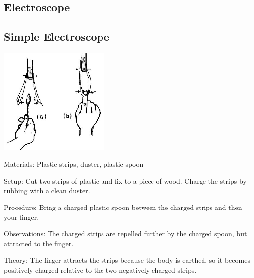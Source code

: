 \begin{multicols}{2}

\section*{Electroscope}


\subsection{Simple Electroscope}

\begin{center}
\includegraphics[width=0.4\textwidth]{./img/source/simple-electroscope.jpg}
\end{center}

\begin{description*}
\item[Materials:]{Plastic strips, duster, plastic spoon}
\item[Setup:]{Cut two strips of plastic and fix to a piece of wood. Charge the strips by rubbing with a clean duster.}
\item[Procedure:]{Bring a charged plastic spoon between the charged strips and then your finger.}
\item[Observations:]{The charged strips are repelled further by the charged spoon, but attracted to the finger.}
\item[Theory:]{The finger attracts the strips because the body is earthed, so it becomes positively
charged relative to the two negatively charged strips.}
\end{description*}

\columnbreak


\end{multicols}
